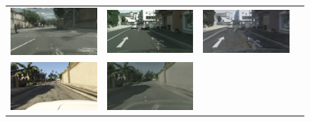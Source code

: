 \begin{figure}[h]
{\begin{tabular}{cc cc}
    \includegraphics[width=\myw, height=\myh]{figs/gta-cityscapes/fake-cityscapes-02212-fs8.png} &
    \includegraphics[width=\myw, height=\myh]{figs/gta-cityscapes/cityscapes-02212-fs8.png} &
    \includegraphics[width=\myw, height=\myh]{figs/gta-cityscapes/fake-gta-02212-fs8.png}
   \\
    \includegraphics[width=\myw, height=\myh]{figs/gta-cityscapes/gta-03655-fs8.png} &
    \includegraphics[width=\myw, height=\myh]{figs/gta-cityscapes/fake-cityscapes-03655-fs8.png} &

\end{tabular}}
\end{figure}
